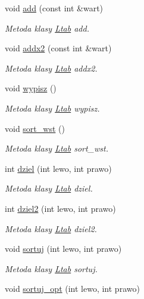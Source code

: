 \begin{DoxyCompactItemize}
void \hyperlink{class_ltab_a9d984316c3c88691e9ccfeaed884bfff}{add} (const int \&wart)
\begin{DoxyCompactList}\small\item\em Metoda klasy \hyperlink{class_ltab}{Ltab} add. \end{DoxyCompactList}\item 
void \hyperlink{class_ltab_ade764d08f90e2989bef67a652202f9f1}{addx2} (const int \&wart)
\begin{DoxyCompactList}\small\item\em Metoda klasy \hyperlink{class_ltab}{Ltab} addx2. \end{DoxyCompactList}\item 
void \hyperlink{class_ltab_a4b81c405bc3cf4b4510b0e879ec983b2}{wypisz} ()
\begin{DoxyCompactList}\small\item\em Metoda klasy \hyperlink{class_ltab}{Ltab} wypisz. \end{DoxyCompactList}\item 
void \hyperlink{class_ltab_adc068a9b92a287cdd0b57497b9859eca}{sort\-\_\-wst} ()
\begin{DoxyCompactList}\small\item\em Metoda klasy \hyperlink{class_ltab}{Ltab} sort\-\_\-wst. \end{DoxyCompactList}\item 
int \hyperlink{class_ltab_a83fcc265ec39c5a78826118e86aaddc2}{dziel} (int lewo, int prawo)
\begin{DoxyCompactList}\small\item\em Metoda klasy \hyperlink{class_ltab}{Ltab} dziel. \end{DoxyCompactList}\item 
int \hyperlink{class_ltab_aadee500f6112321d8664f3989daf37df}{dziel2} (int lewo, int prawo)
\begin{DoxyCompactList}\small\item\em Metoda klasy \hyperlink{class_ltab}{Ltab} dziel2. \end{DoxyCompactList}\item 
void \hyperlink{class_ltab_a3fbc0651b0d2c4592357e4028ff5a0f7}{sortuj} (int lewo, int prawo)
\begin{DoxyCompactList}\small\item\em Metoda klasy \hyperlink{class_ltab}{Ltab} sortuj. \end{DoxyCompactList}\item 
void \hyperlink{class_ltab_a30e46ca8cc5bada27cf3f7d2eedce4d1}{sortuj\-\_\-opt} (int lewo, int prawo)

\end{DoxyCompactItemize}
